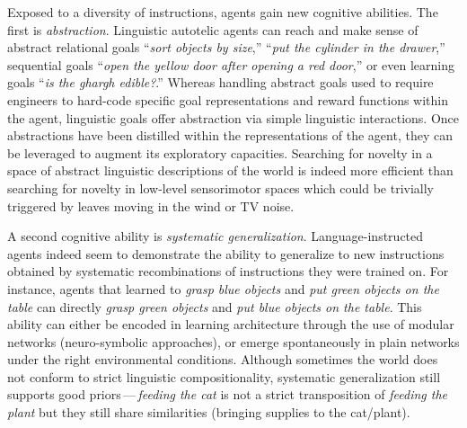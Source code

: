 Exposed to a diversity of instructions, agents gain new cognitive abilities. The first is \textit{abstraction}. Linguistic autotelic agents can reach and make sense of abstract  relational goals ``\textit{sort objects by size},''\cite{jiang_language_2019} ``\textit{put the cylinder in the drawer},''\cite{lynch_grounding_2020} sequential goals ``\textit{open the yellow door after opening a red door},''\cite{chevalier-boisvert_baby-ai_2019} or even learning goals ``\textit{is the ghargh edible?}.''\cite{yuan_interactive_2019} Whereas handling abstract goals used to require engineers to hard-code specific goal representations and reward functions within the agent,\cite{curious,team2021open} linguistic goals offer abstraction via simple linguistic interactions.\cite{bahdanau_learning_2019,colas_language_2020} Once abstractions have been distilled within the representations of the agent, they can be leveraged to augment its exploratory capacities. Searching for novelty in a space of abstract linguistic descriptions of the world is indeed more efficient than searching for novelty in low-level sensorimotor spaces which could be trivially triggered by leaves moving in the wind or TV noise.\cite{tam2022semantic, Mu2022ImprovingIE}

A second cognitive ability is \textit{systematic generalization}. Language-instructed agents indeed seem to demonstrate the ability to generalize to new instructions obtained by systematic recombinations of instructions they were trained on.\cite{hill_emergent_2019} For instance, agents that learned to \textit{grasp blue objects} and \textit{put green objects on the table} can directly \textit{grasp green objects} and \textit{put blue objects on the table}.\cite{Hermann2017, chevalier-boisvert_baby-ai_2019, bahdanau_learning_2019, hill_emergent_2019, hill_human_2020, colas_language_2020, sharma2021skill, karch2021grounding} This ability can either be encoded in learning architecture through the use of modular networks (neuro-symbolic approaches), or emerge spontaneously in plain networks under the right environmental conditions.\cite{hill_emergent_2019} Although sometimes the world does not conform to strict linguistic compositionality, systematic generalization still supports good priors\,---\,\eg \textit{feeding the cat} is not a strict transposition of \textit{feeding the plant} but they still share similarities (bringing supplies to the cat/plant).\cite{colas_language_2020}

